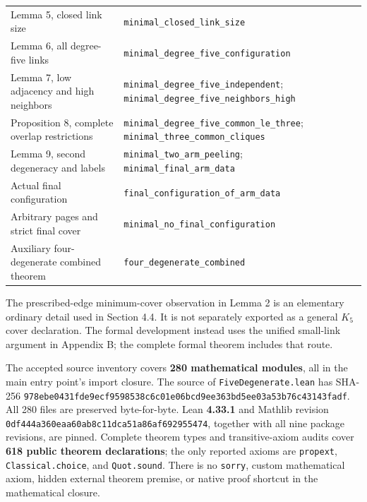 \documentclass[11pt]{article}
\begin{document}
{{\begin{longtable}[]{@{}
  >{\raggedright\arraybackslash}p{}
  >{\raggedright\arraybackslash}p{}@{}}
Lemma 5, closed link size & \texttt{minimal\_closed\_link\_size} \\
Lemma 6, all degree-five links &
\texttt{minimal\_degree\_five\_configuration} \\
Lemma 7, low adjacency and high neighbors &
\texttt{minimal\_degree\_five\_independent};
\texttt{minimal\_degree\_five\_neighbors\_high} \\
Proposition 8, complete overlap restrictions &
\texttt{minimal\_degree\_five\_common\_le\_three};
\texttt{minimal\_three\_common\_cliques} \\
Lemma 9, second degeneracy and labels &
\texttt{minimal\_two\_arm\_peeling};
\texttt{minimal\_final\_arm\_data} \\
Actual final configuration &
\texttt{final\_configuration\_of\_arm\_data} \\
Arbitrary pages and strict final cover &
\texttt{minimal\_no\_final\_configuration} \\
Auxiliary four-degenerate combined theorem &
\texttt{four\_degenerate\_combined} \\
\end{longtable}}
}

The prescribed-edge minimum-cover observation in Lemma 2 is an
elementary ordinary detail used in Section 4.4. It is not separately
exported as a general \(K_5\) cover declaration. The formal development
instead uses the unified small-link argument in Appendix B; the complete
formal theorem includes that route.

The accepted source inventory covers \textbf{280 mathematical modules},
all in the main entry point's import closure. The source of
\texttt{FiveDegenerate.lean} has SHA-256
\nolinkurl{978ebe0431fde9ecf9598538c6c01e06bcd9ee363bd5ee03a53b76c43143fadf}.
All 280 files are preserved byte-for-byte. Lean \textbf{4.33.1} and
Mathlib revision \nolinkurl{0df444a360eaa60ab8c11dca51a86af692955474},
together with all nine package revisions, are pinned. Complete theorem
types and transitive-axiom audits cover \textbf{618 public theorem
declarations}; the only reported axioms are \texttt{propext},
\texttt{Classical.choice}, and \texttt{Quot.sound}. There is no
\texttt{sorry}, custom mathematical axiom, hidden external theorem
premise, or native proof shortcut in the mathematical closure.
\end{document}
